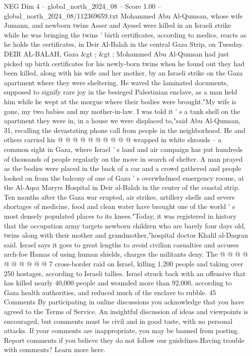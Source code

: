 \begin{textsample}{NEG Dim 4 – global\_north\_2024\_08 – Score 1.00 – global\_north\_2024\_08/112369659.txt}  \label{ex:f4_neg_304}
Mohammed Abu Al-Qumsan, whose wife Jumann, and newborn twins Asser and Ayssel were killed in an Israeli strike while he was bringing the twins ' birth certificates, according to medics, reacts as he holds the certificates, in Deir Al-Balah in the central Gaza Strip, on Tuesday.
DEIR AL-BALAH, Gaza \&gt ; \&gt ; Mohammed Abu Al-Qumsan had just picked up birth certificates for his newly-born twins when he found out they had been killed, along with his wife and her mother, by an Israeli strike on the Gaza apartment where they were sheltering.
He waved the laminated documents, supposed to signify rare joy in the besieged Palestinian enclave, as a man held him while he wept at the morgue where their bodies were brought."My wife is gone, my two babies and my mother-in-law.
I was told it ' s a tank shell on the apartment they were in, in a house we were displaced to,"said Abu Al-Qumsan, 31, recalling the devastating phone call from people in the neighborhood.
He and others carried his @ @ @ @ @ @ @ @ @ @ wrapped in white shrouds -- a common sight in Gaza, where Israel ' s land and air campaign has put hundreds of thousands of people regularly on the move in search of shelter.
A man prayed as the bodies were placed in the back of a car and a crowd gathered and people looked on from the balcony of one of Gaza ' s overwhelmed emergency rooms, at the Al-Aqsa Maryrs Hospital in Deir al-Balah in the center of the coastal strip.
Ten months after the Gaza war erupted, air strikes, artillery shells and severe shortages of medicine, food and clean water have brought one of the world ' s most densely populated places to its knees."Today, it was registered in history that the occupation army targets newborn children who are barely four days old, twins along with their mother and grandmother,"hospital doctor Khalil al-Daqran said.
Israel says it goes to great lengths to avoid civilian casualties and accuses arch-foe Hamas of using human shields, charges the militants deny.
The @ @ @ @ @ @ @ @ @ @ 7 cross-border raid on Israel, killing 1,200 people and taking over 250 hostages, according to Israeli tallies.
Israel struck back with an offensive that has killed nearly 40,000 people and wounded more than 92,000, according to Gaza health authorities, and reduced much of the enclave to rubble. 45 Comments By participating in online discussions you acknowledge that you have agreed to the Terms of Service.
An insightful discussion of ideas and viewpoints is encouraged, but comments must be civil and in good taste, with no personal attacks.
If your comments are inappropriate, you may be banned from posting.
Report comments if you believe they do not follow our guidelines.Having trouble with comments?
Learn more here.

\end{textsample}
